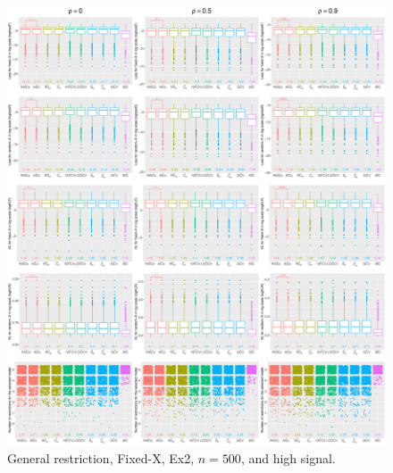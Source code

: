 \clearpage
\begin{figure}[!ht]
\centering
\includegraphics[width=\textwidth]{figures/supplement/fixedx/general_restriction/Ex2_n500_hsnr.eps}
\caption{General restriction, Fixed-X, Ex2, $n=500$, and high signal.}
\end{figure}
\clearpage
